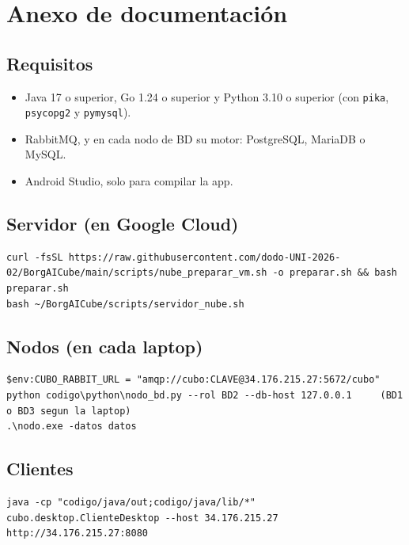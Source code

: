 \documentclass[10pt,a4paper]{article}
\begin{document}
\section{Anexo de documentación}

\subsection*{Requisitos}

\begin{itemize}
    \item Java 17 o superior, Go 1.24 o superior y Python 3.10 o superior (con \texttt{pika},
    \texttt{psycopg2} y \texttt{pymysql}).
    \item RabbitMQ, y en cada nodo de BD su motor: PostgreSQL, MariaDB o MySQL.
    \item Android Studio, solo para compilar la app.
\end{itemize}

\subsection*{Servidor (en Google Cloud)}

\begin{lstlisting}[language={},numbers=none]
curl -fsSL https://raw.githubusercontent.com/dodo-UNI-2026-02/BorgAICube/main/scripts/nube_preparar_vm.sh -o preparar.sh && bash preparar.sh
bash ~/BorgAICube/scripts/servidor_nube.sh
\end{lstlisting}

\subsection*{Nodos (en cada laptop)}

\begin{lstlisting}[language={},numbers=none]
$env:CUBO_RABBIT_URL = "amqp://cubo:CLAVE@34.176.215.27:5672/cubo"
python codigo\python\nodo_bd.py --rol BD2 --db-host 127.0.0.1     (BD1 o BD3 segun la laptop)
.\nodo.exe -datos datos
\end{lstlisting}

\subsection*{Clientes}

\begin{lstlisting}[language={},numbers=none]
java -cp "codigo/java/out;codigo/java/lib/*" cubo.desktop.ClienteDesktop --host 34.176.215.27
http://34.176.215.27:8080
\end{lstlisting}
\end{document}
